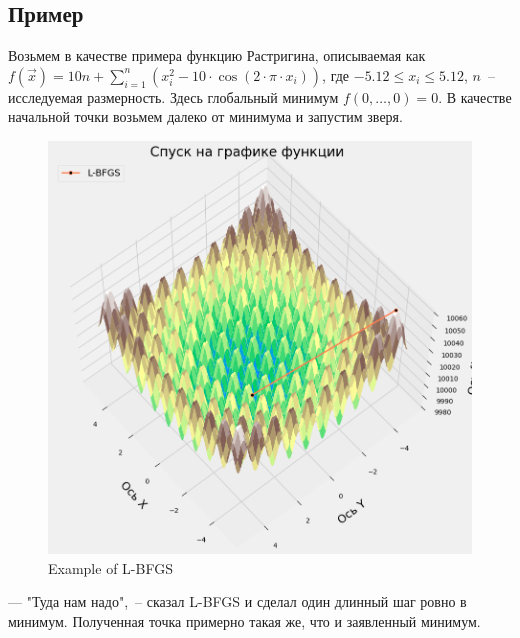\documentclass[12pt, a4paper, oneside, final]{article}
\begin{document}
	\subsection*{Пример}
	Возьмем в качестве примера функцию Растригина, описываемая как $f(\vec{x}) = 10n + \sum\limits_{i = 1}^{n}{\left(x_{i}^{2} - 10 \cdot \cos{(2 \cdot \pi \cdot x_{i})}\right)}$, где $-5.12 \leqslant x_{i} \leqslant 5.12$, $n$~-- исследуемая размерность.
	Здесь глобальный минимум $f(0, \ldots, 0) = 0$.
	В качестве начальной точки возьмем далеко от минимума и запустим зверя.
	\begin{figure}[H]
		\centering
		\includegraphics[scale = 0.55]{Image/AT1_LBFGS_3D_PLOT_1.png}
		\caption*{Example of L-BFGS}
	\end{figure}
	--- "Туда нам надо",~-- сказал L-BFGS и сделал один длинный шаг ровно в минимум.
	Полученная точка примерно такая же, что и заявленный минимум.
\end{document}
